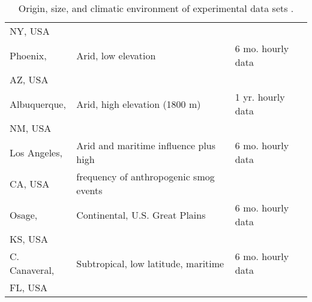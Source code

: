 \begin{table}[H]
{\begin{tabular}{lll}
            NY, USA & & \\
            Phoenix, & Arid, low elevation & 6 mo. hourly data \\
            AZ, USA & & \\
            Albuquerque, & Arid, high elevation (1800 m) & 1 yr. hourly data \\
            NM, USA & & \\
            Los Angeles, & Arid and maritime influence plus high & 6 mo. hourly data \\
            CA, USA & frequency of anthropogenic smog events &  \\
            Osage, & Continental, U.S. Great Plains & 6 mo. hourly data \\
            KS, USA & & \\
            C. Canaveral, & Subtropical, low latitude, maritime & 6 mo. hourly data \\
            FL, USA & & \\
            \bottomrule
        \end{tabular}
    }
    \caption{\small Origin, size, and climatic environment of experimental data sets \cite{Perez1990}.}
    \label{tab:Perez_experimental_data}
\end{table}

